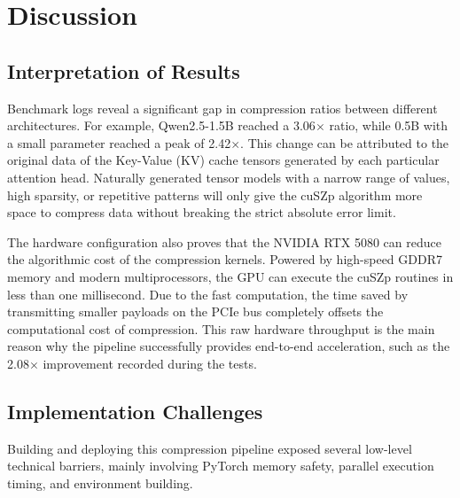 \documentclass{polyu-comp}
\begin{document}
\section{Discussion}
\label{sec:discussion}

\subsection{Interpretation of Results}

Benchmark logs reveal a significant gap in compression ratios between different architectures. For example, Qwen2.5-1.5B reached a 3.06$\times$ ratio, while 0.5B with a small parameter reached a peak of 2.42$\times$. This change can be attributed to the original data of the Key-Value (KV) cache tensors generated by each particular attention head. Naturally generated tensor models with a narrow range of values, high sparsity, or repetitive patterns will only give the cuSZp algorithm more space to compress data without breaking the strict absolute error limit.

The hardware configuration also proves that the NVIDIA RTX 5080 can reduce the algorithmic cost of the compression kernels. Powered by high-speed GDDR7 memory and modern multiprocessors, the GPU can execute the cuSZp routines in less than one millisecond. Due to the fast computation, the time saved by transmitting smaller payloads on the PCIe bus completely offsets the computational cost of compression. This raw hardware throughput is the main reason why the pipeline successfully provides end-to-end acceleration, such as the 2.08$\times$ improvement recorded during the tests.

\subsection{Implementation Challenges}

Building and deploying this compression pipeline exposed several low-level technical barriers, mainly involving PyTorch memory safety, parallel execution timing, and environment building.
\end{document}
